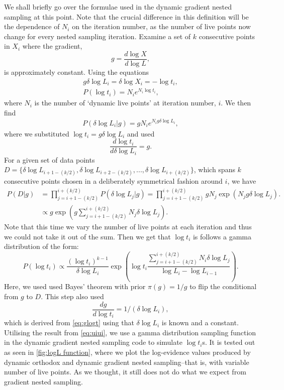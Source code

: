 We shall briefly go over the formulae used in the dynamic gradient nested sampling at this point. Note that the crucial difference in this definition will be the dependence of $N_i$ on the iteration number, as the number of live points now change for every nested sampling iteration. Examine a set of $k$ consecutive points in ${X_i}$ where the gradient,
\begin{equation}
g= \frac{d \log X}{d \log L},
\end{equation}
%
is approximately constant. Using the equations 
%
\begin{align}
g \delta \log L_{i} = \delta \log X_i= -\log t_i, \\
P(\log t_{i})=N_i e^{N_i \log t_i},
\end{align}
%
where $N_i$ is the number of `dynamic live points' at iteration number, $i$. We then find
%
\begin{align}
P(\delta \log L_i|g)= gN_ie^{N_i g \delta \log L_i},
\end{align}
%
where we substituted  $\log t_i= g\delta \log L_i$ and used 
%
\begin{equation}
    \frac{d \log t_i}{d\delta \log L_i}= g.
\end{equation}
%
For a given set of data points $D= \{ \delta \log L_{i+1-(k/2)},\delta \log L_{i+2-(k/2)},...,\delta \log L_{i+(k/2)} \}$, which spans $k$ consecutive points chosen in a deliberately symmetrical fashion around $i$, we have
%
\begin{align}
P(D|g)&= \prod_{j=i+1-(k/2)}^{i+(k/2)} P(\delta \log L_j|g) = \prod_{j=i+1-(k/2)}^{i+(k/2)} gN_j\exp({N_jg \delta \log L_j}).\\
&\propto  g\exp\left( g \sum_{j=i+1-(k/2)}^{i+(k/2)} N_j \delta \log L_j\right).
\end{align}
Note that this time we vary the number of live points at each iteration and thus we could not take it out of the sum. Then we get that $\log t_i$ is follows a gamma distribution \cite{hogg_craig_1971} of the form:
%
\begin{equation}
P(\log t_i) \propto \frac{(\log t_i)^{k-1} }{\delta \log L_i}\exp \left( \log t_i \frac{\sum_{j=i+1-(k/2)}^{i+(k/2)} N_i \delta \log L_j}{\log L_i-\log L_{i-1}}\right).
\label{eq:uiui}
\end{equation}
%
Here, we used used Bayes' theorem with prior $\pi (g)=1/g$ to flip the conditional from $g$ to $D$. This step also used
%
\begin{equation}
  \frac{dg}{d\log t_i}  = 1/(\delta \log L_{i}),
\end{equation}
%
which is derived from \cref{eq:glogt} using that $\delta \log L_{i}$ is known and a constant. Utilising the result from \cref{eq:uiui}, we use a gamma distribution sampling function in the dynamic gradient nested sampling code to simulate $\log t_i$s. It is tested out as seen in \cref{fig:logL function}, where we plot the log-evidence values produced by dynamic orthodox and dynamic gradient nested sampling--that is, with variable number of live points. As we thought, it still does not do what we expect from gradient nested sampling.

